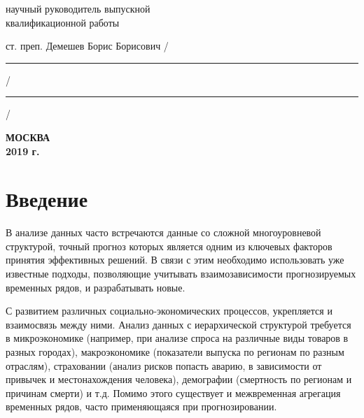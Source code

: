 \documentclass[12pt,a4paper, oneside]{extreport}
\begin{document}
\hfill{}

\noindent
научный руководитель выпускной \\
квалификационной работы

\noindent
ст. преп. Демешев Борис Борисович
\hfill /\rule{6em}{0.5pt}/\rule{6em}{0.5pt}/

\hfill{}

%
%

\vfill

\begin{center}
\normalsize \bfseries МОСКВА \\ 2019 г.
\end{center}
\endgroup




\tableofcontents  %



\chapter*{Введение}


В анализе данных часто встречаются данные со сложной многоуровневой структурой, точный прогноз которых является одним из ключевых факторов принятия эффективных решений. В связи с этим необходимо использовать уже известные подходы, позволяющие учитывать взаимозависимости прогнозируемых временных рядов, и разрабатывать новые.  


С    развитием различных социально-экономических процессов, укрепляется и взаимосвязь между ними. Анализ данных с иерархической структурой требуется в микроэкономике (например, при анализе спроса на различные виды товаров в разных городах), макроэкономике (показатели выпуска по регионам по разным отраслям), страховании (анализ рисков попасть аварию, в зависимости от привычек и местонахождения человека),  демографии (смертность по регионам и причинам смерти) и т.д.  Помимо этого существует и межвременная агрегация временных рядов, часто применяющаяся при прогнозировании.  
\end{document}
